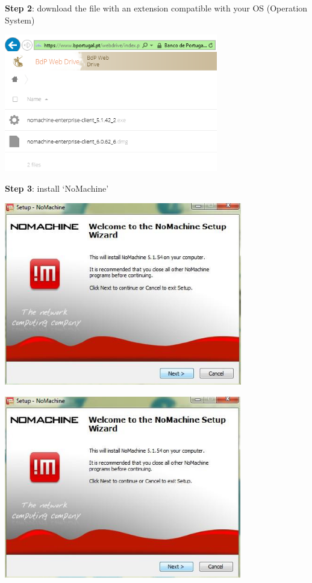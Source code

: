 \documentclass[]{book}
\begin{document}
\textbf{Step 2}: download the file with an extension compatible with your OS
(Operation System)

\includegraphics[width=3.6682in,height=2.3622in]{./media/image18.png}

\textbf{Step 3}: install `NoMachine'

\includegraphics[width=4.07941in,height=3.14961in]{./media/image19.png}

\includegraphics[width=4.06859in,height=3.14961in]{./media/image20.png}
\end{document}
